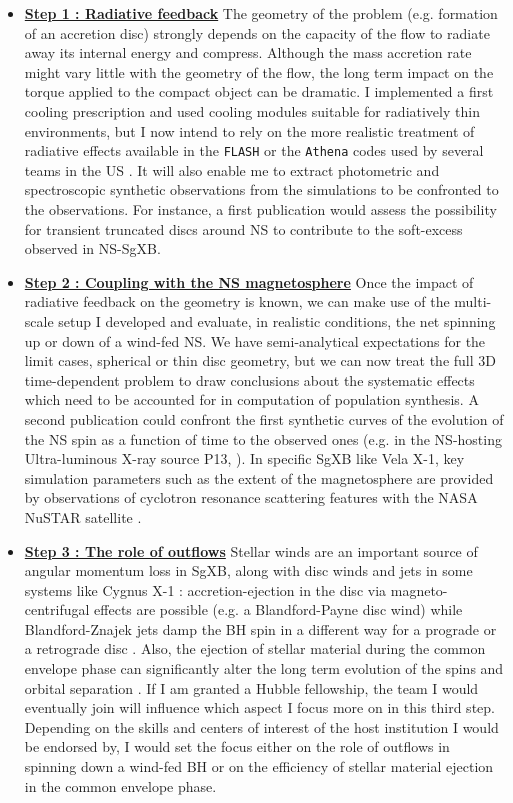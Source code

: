\documentclass[letterpaper,12pt,onecolumn]{article}
\makeatletter
\newcommand{\sgx}{SgXB\xspace}
\newcommand*{\ns}{NS\@\xspace}
\newcommand*{\bh}{BH\@\xspace}
\newcommand*{\eg}{e.g.\@\xspace}
\makeatother
\begin{document}
\begin{itemize}
\item \textbf{\underline{Step 1 : Radiative feedback}} The geometry of the problem (\eg formation of an accretion disc) strongly depends on the capacity of the flow to radiate away its internal energy and compress. Although the mass accretion rate might vary little with the geometry of the flow, the long term impact on the torque applied to the compact object can be dramatic. I implemented a first cooling prescription and used cooling modules suitable for radiatively thin environments, but I now intend to rely on the more realistic treatment of radiative effects available in the \texttt{FLASH} or the \texttt{Athena} codes used by several teams in the US \citep{Jiang2014a}. It will also enable me to extract photometric and spectroscopic synthetic observations from the simulations to be confronted to the observations. For instance, a first publication would assess the possibility for transient truncated discs around \ns to contribute to the soft-excess observed in \ns-\sgx \citep{Bozzo2012}.
\item \textbf{\underline{Step 2 : Coupling with the \ns magnetosphere}} Once the impact of radiative feedback on the geometry is known, we can make use of the multi-scale setup I developed and evaluate, in realistic conditions, the net spinning up or down of a wind-fed \ns. We have semi-analytical expectations for the limit cases, spherical or thin disc geometry, but we can now treat the full 3D time-dependent problem to draw conclusions about the systematic effects which need to be accounted for in computation of population synthesis. A second publication could confront the first synthetic curves of the evolution of the \ns spin as a function of time to the observed ones (\eg in the \ns-hosting Ultra-luminous X-ray source P13, \citep{Fuerst2018}). In specific \sgx like Vela X-1, key simulation parameters such as the extent of the magnetosphere are provided by observations of cyclotron resonance scattering features with the NASA NuSTAR satellite \citep{Furst2014}.
\item \textbf{\underline{Step 3 : The role of outflows}} Stellar winds are an important source of angular momentum loss in \sgx, along with disc winds and jets in some systems like Cygnus X-1 : accretion-ejection in the disc via magneto-centrifugal effects are possible (\eg a Blandford-Payne disc wind) while Blandford-Znajek jets damp the \bh spin in a different way for a prograde or a retrograde disc \citep{Tchekhovskoy2012}. Also, the ejection of stellar material during the common envelope phase can significantly alter the long term evolution of the spins and orbital separation \cite{Murguia-Berthier2017}. If I am granted a Hubble fellowship, the team I would eventually join will influence which aspect I focus more on in this third step. Depending on the skills and centers of interest of the host institution I would be endorsed by, I would set the focus either on the role of outflows in spinning down a wind-fed \bh or on the efficiency of stellar material ejection in the common envelope phase.
\end{itemize}
\end{document}
